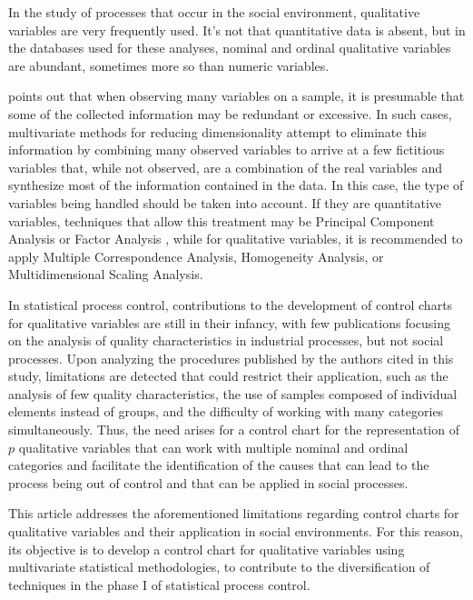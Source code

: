 \documentclass[mathematics,article,submit,moreauthors,pdftex]{mdpi}
\begin{document}
In the study of processes that occur in the social environment,
qualitative variables are very frequently used. It's not that
quantitative data is absent, but in the databases used for these
analyses, nominal and ordinal qualitative variables are abundant,
sometimes more so than numeric variables.

\citet{perez2004} points out that when observing many variables on a
sample, it is presumable that some of the collected information may be
redundant or excessive. In such cases, multivariate methods for reducing
dimensionality attempt to eliminate this information by combining many
observed variables to arrive at a few fictitious variables that, while
not observed, are a combination of the real variables and synthesize
most of the information contained in the data. In this case, the type of
variables being handled should be taken into account. If they are
quantitative variables, techniques that allow this treatment may be
Principal Component Analysis \citep{Person1901, Hotelling1933} or Factor
Analysis \citep{ch1904, thurstone1947, kaiser1958}, while for
qualitative variables, it is recommended to apply Multiple
Correspondence Analysis, Homogeneity Analysis, or Multidimensional
Scaling Analysis.

In statistical process control, contributions to the development of
control charts for qualitative variables are still in their infancy,
with few publications focusing on the analysis of quality
characteristics in industrial processes, but not social processes. Upon
analyzing the procedures published by the authors cited in this study,
limitations are detected that could restrict their application, such as
the analysis of few quality characteristics, the use of samples composed
of individual elements instead of groups, and the difficulty of working
with many categories simultaneously. Thus, the need arises for a control
chart for the representation of \(p\) qualitative variables that can
work with multiple nominal and ordinal categories and facilitate the
identification of the causes that can lead to the process being out of
control and that can be applied in social processes.

This article addresses the aforementioned limitations regarding control
charts for qualitative variables and their application in social
environments. For this reason, its objective is to develop a control
chart for qualitative variables using multivariate statistical
methodologies, to contribute to the diversification of techniques in the
phase I of statistical process control.
\end{document}
